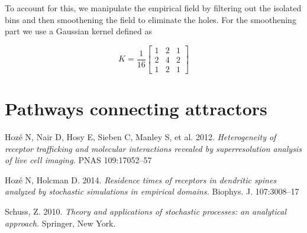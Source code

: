 \documentclass[14pt,a4paper]{article}
\begin{document}
To account for this, we manipulate the empirical field by filtering out the isolated bins and then smoothening the field to eliminate the holes. For the smoothening part we use a Gaussian kernel defined as

\begin{equation}
K = \frac{1}{16} \begin{bmatrix} 1 & 2 & 1 \\ 2 & 4 & 2 \\ 1 & 2 & 1\end{bmatrix}
\end{equation}

\section{Pathways connecting attractors}




\begin{thebibliography}{9}
Hoz\'e N, Nair D, Hosy E, Sieben C, Manley S, et al. 2012. \textit{Heterogeneity of receptor trafficking and molecular interactions revealed by superresolution analysis of live cell imaging.} PNAS 109:17052–57

Hoz\'e N, Holcman D. 2014. \textit{Residence times of receptors in dendritic spines analyzed by stochastic simulations in empirical domains.} Biophys. J. 107:3008–17

Schuss, Z. 2010. \textit{Theory and applications of stochastic processes: an analytical approach.} Springer, New York.

\end{thebibliography}
\end{document}
